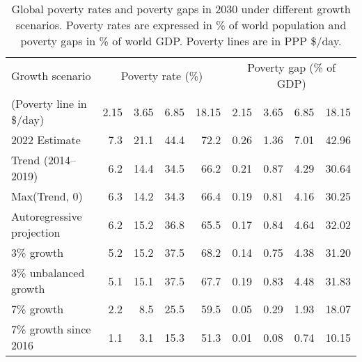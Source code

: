 \begin{table}[h]

\caption[Global poverty (rates and gaps) in 2030 under different growth scenarios.]{\label{tab:poverty}Global poverty rates and poverty gaps in 2030 under different growth scenarios. Poverty rates are expressed in \% of world population and poverty gaps in \% of world GDP. Poverty lines are in PPP \$/day.}
\centering
\begin{tabular}[t]{lrrrrrrrr}
\toprule Growth scenario & \multicolumn{4}{c}{Poverty rate (\%)} & \multicolumn{4}{c}{Poverty gap (\% of GDP)} \\ 
 (Poverty line in \$/day)  & 2.15 & 3.65 & 6.85 & 18.15 & 2.15 & 3.65 & 6.85 & 18.15\\
\midrule
2022 Estimate & 7.3 & 21.1 & 44.4 & 72.2 & 0.26 & 1.36 & 7.01 & 42.96\\
Trend (2014--2019) & 6.2 & 14.4 & 34.5 & 66.2 & 0.21 & 0.87 & 4.29 & 30.64\\
Max(Trend, 0) & 6.3 & 14.2 & 34.3 & 66.4 & 0.19 & 0.81 & 4.16 & 30.25\\
Autoregressive projection & 6.2 & 15.2 & 36.8 & 65.5 & 0.17 & 0.84 & 4.64 & 32.02\\
3\% growth & 5.2 & 15.2 & 37.5 & 68.2 & 0.14 & 0.75 & 4.38 & 31.20\\
3\% unbalanced growth & 5.1 & 15.1 & 37.5 & 67.7 & 0.19 & 0.83 & 4.48 & 31.83\\
7\% growth & 2.2 & 8.5 & 25.5 & 59.5 & 0.05 & 0.29 & 1.93 & 18.07\\
7\% growth since 2016 & 1.1 & 3.1 & 15.3 & 51.3 & 0.01 & 0.08 & 0.74 & 10.15\\
\bottomrule
\end{tabular}
\end{table}